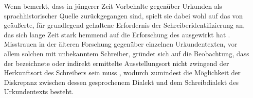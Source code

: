 Wenn \citeauthor{schulze2011} bemerkt, dass in jüngerer Zeit Vorbehalte
gegenüber Urkunden als sprachhistorischer Quelle zurückgegangen sind, spielt
sie dabei wohl auf das von \textcites[23--33]{boesch1946}[389]{haacke1955}
geäußerte, für grundlegend gehaltene Erfordernis der
Schrei\-ber\-identifizierung an, das sich lange Zeit stark hemmend auf die
Erforschung des \CAO{} ausgewirkt hat \autocite[21--22]{schulze2011}.
Misstrauen in der älteren Forschung gegenüber einzelnen Urkunden\-texten, vor
allem solchen mit unbekanntem Schreiber, gründet sich auf die Beobachtung, dass
der bezeichnete oder indirekt ermittelte Ausstellungsort nicht zwingend der
Herkunftsort des Schreibers sein muss
\autocite[16]{schulze2011},
%
%
wodurch zumindest die Möglichkeit der Diskrepanz zwischen dessen gesprochenem
Dialekt und dem Schreibdialekt des Urkundentexts besteht.
% 

